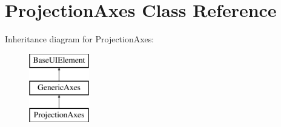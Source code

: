 \hypertarget{classProjectionAxes}{\section{Projection\-Axes Class Reference}
\label{classProjectionAxes}
}
Inheritance diagram for Projection\-Axes\-:\begin{figure}[H]
\begin{center}
\leavevmode
\includegraphics[height=3.000000cm]{classProjectionAxes}
\end{center}
\end{figure}
